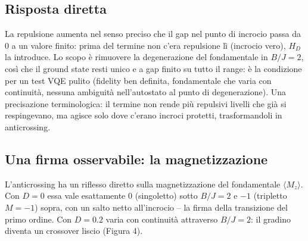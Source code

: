 \documentclass[11pt,a4paper]{article}
\begin{document}
\begin{center}
\end{center}

\subsection{Risposta diretta}

La repulsione aumenta nel senso preciso che il gap nel punto di incrocio passa da 0 a
un valore finito: prima del termine non c'era repulsione l\`i (incrocio vero), $H_D$ la
introduce. Lo scopo \`e rimuovere la degenerazione del fondamentale in $B/J=2$, cos\`i
che il ground state resti unico e a gap finito su tutto il range: \`e la condizione
per un test VQE pulito (fidelity ben definita, fondamentale che varia con continuit\`a,
nessuna ambiguit\`a nell'autostato al punto di degenerazione). Una precisazione
terminologica: il termine non rende pi\`u repulsivi livelli che gi\`a si respingevano,
ma agisce solo dove c'erano incroci protetti, trasformandoli in anticrossing.

\subsection{Una firma osservabile: la magnetizzazione}

L'anticrossing ha un riflesso diretto sulla magnetizzazione del fondamentale
$\langle M_z\rangle$. Con $D=0$ essa vale esattamente $0$ (singoletto) sotto $B/J=2$
e $-1$ (tripletto $M=-1$) sopra, con un salto netto all'incrocio -- la firma della
transizione del primo ordine. Con $D=0.2$ varia con continuit\`a attraverso $B/J=2$:
il gradino diventa un crossover liscio (Figura 4).

\begin{center}
\end{center}
\end{document}

